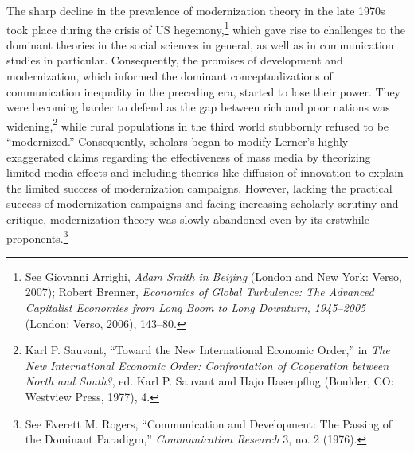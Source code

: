 \documentclass{tufte-handout}
\begin{document}
The sharp decline in the prevalence of modernization theory in the late
1970s took place during the crisis of US hegemony,\footnote{See Giovanni
  Arrighi, \emph{Adam Smith in Beijing} (London and New York: Verso,
  2007); Robert Brenner, \emph{Economics of Global Turbulence: The
  Advanced Capitalist Economies from Long Boom to Long Downturn,
  1945--2005} (London: Verso, 2006), 143--80.} which gave rise to
challenges to the dominant theories in the social sciences in general,
as well as in communication studies in particular. Consequently, the
promises of development and modernization, which informed the dominant
conceptualizations of communication inequality in the preceding era,
started to lose their power. They were becoming harder to defend as the
gap between rich and poor nations was widening,\footnote{Karl P.
  Sauvant, ``Toward the New International Economic Order,'' in \emph{The
  New International Economic Order: Confrontation of Cooperation between
  North and South?}, ed. Karl P. Sauvant and Hajo Hasenpflug (Boulder,
  CO: Westview Press, 1977), 4.} while rural populations in the third
world stubbornly refused to be ``modernized.'' Consequently, scholars
began to modify Lerner's highly exaggerated claims regarding the
effectiveness of mass media by theorizing limited media effects and
including theories like diffusion of innovation to explain the limited
success of modernization campaigns. However, lacking the practical
success of modernization campaigns and facing increasing scholarly
scrutiny and critique, modernization theory was slowly abandoned even by
its erstwhile proponents.\footnote{See Everett M. Rogers,
  ``Communication and Development: The Passing of the Dominant
  Paradigm,'' \emph{Communication Research} 3, no. 2 (1976).}
\end{document}
